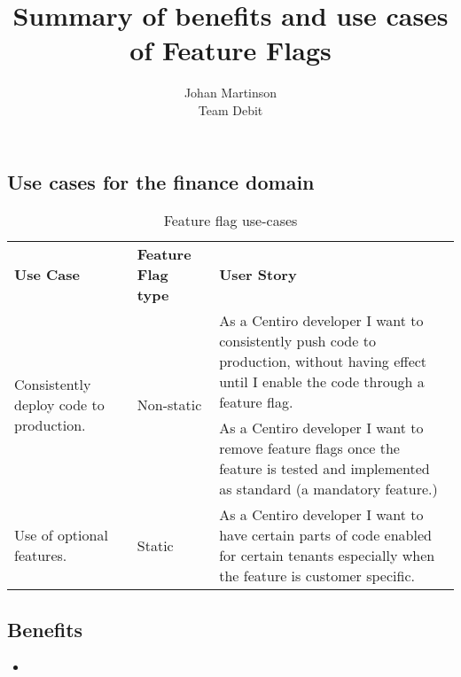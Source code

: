 \documentclass{article}
\author{Johan Martinson\\Team Debit}
\begin{document}
\title{Summary of benefits and use cases of Feature Flags}
\maketitle


\subsection*{Use cases for the finance domain}

\begin{table}[h!]
    \begin{center}
        \caption{Feature flag use-cases}
        \label{tab:useCases}
        \renewcommand{\arraystretch}{1.5} %
        \begin{tabular}{m{.25\linewidth}lm{.5\linewidth}} %
            \textbf{Use Case} & \textbf{Feature Flag type} & \textbf{User Story}                                                                                                                         \\
            \multirow{2}{\linewidth}{Consistently deploy code to production.} & \multirow{2}{*}{\centering Non-static} & As a Centiro developer I want to consistently push code to production, without having effect until I enable the code through a feature flag. \\
             & & As a Centiro developer I want to remove feature flags once the feature is tested and implemented as standard (a mandatory feature.)                                                                                                                                 \\
             \hline
             \multirow{1}{\linewidth}{Use of optional features.} & \multirow{1}{*}{\centering Static} & As a Centiro developer I want to have certain parts of code enabled for certain tenants especially when the feature is customer specific. \\
        \end{tabular}
    \end{center}
\end{table}

\subsection*{Benefits}
\begin{itemize}
    \item
\end{itemize}
\end{document}
